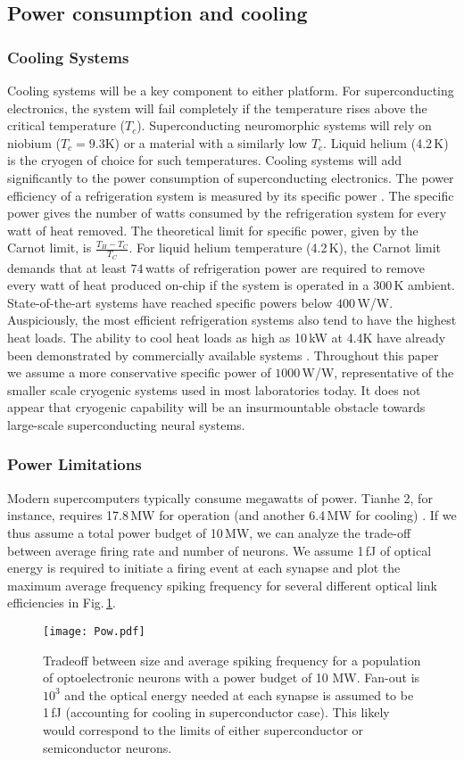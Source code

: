 \documentclass[twocolumn]{article}
\begin{document}
\subsection{Power consumption and cooling}
\subsubsection{Cooling Systems}
Cooling systems will be a key component to either platform. For superconducting electronics, the system will fail completely if the temperature rises above the critical temperature ($T_c$). Superconducting neuromorphic systems will rely on niobium ($T_c = 9.3$K) or a material with a similarly low $T_c$. Liquid helium (4.2\,K) is the cryogen of choice for such temperatures. Cooling systems will add significantly to the power consumption of superconducting electronics. The power efficiency of a refrigeration system is measured by its specific power \cite{alekseev2015basics}. The specific power gives the number of watts consumed by the refrigeration system for every watt of heat removed. The theoretical limit for specific power, given by the Carnot limit, is $\frac{T_H - T_C}{T_C}$. For liquid helium temperature (4.2\,K), the Carnot limit demands that at least $74$\,watts of refrigeration power are required to remove every watt of heat produced on-chip if the system is operated in a 300\,K ambient. State-of-the-art systems have reached specific powers below $400$\,W/W. Auspiciously, the most efficient refrigeration systems also tend to have the highest heat loads. The ability to cool heat loads as high as 10\,kW at 4.4K have already been demonstrated by commercially available systems \cite{holmes2013energy}. Throughout this paper we assume a more conservative specific power of $1000$\,W/W, representative of the smaller scale cryogenic systems used in most laboratories today. It does not appear that cryogenic capability will be an insurmountable obstacle towards large-scale superconducting neural systems.

\subsubsection{Power Limitations}
Modern supercomputers typically consume megawatts of power. Tianhe 2, for instance, requires 17.8\,MW for operation (and another 6.4\,MW for cooling) \cite{tolpygo2016superconductor}. If we thus assume a total power budget of 10\,MW, we can analyze the trade-off between average firing rate and number of neurons. We assume 1\,fJ of optical energy is required to initiate a firing event at each synapse and plot the maximum average frequency spiking frequency for several different optical link efficiencies in Fig.\,\ref{fig:freq_size}.
\begin{figure}[h!]
    \centering
    \texttt{[image: Pow.pdf]}
    \caption{Tradeoff between size and average spiking frequency for a population of optoelectronic neurons with a power budget of 10 MW. Fan-out is $10^3$ and the optical energy needed at each synapse is assumed to be 1\,fJ (accounting for cooling in superconductor case). This likely would correspond to the limits of either superconductor or semiconductor neurons.}
    \label{fig:freq_size}
\end{figure}
\end{document}
